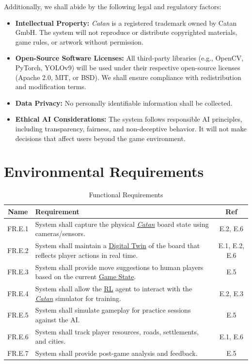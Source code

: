 \documentclass{article}
\newcommand{\Catan}{\href{https://en.wikipedia.org/wiki/Catan}{Catan}}
\newcommand{\RL}{\href{https://www.ibm.com/think/topics/reinforcement-learning}{RL}}
\newcommand{\DigitalTwin}{\href{https://en.wikipedia.org/wiki/Digital_twin}{Digital Twin}}
\newcommand{\GameState}{\href{https://milvus.io/ai-quick-reference/what-is-a-state-in-rl}{Game State}}
\begin{document}
Additionally, we shall abide by the following legal and regulatory factors:
\begin{itemize}
    \item \textbf{Intellectual Property:}
    \emph{Catan} is a registered trademark owned by Catan GmbH. The system will not reproduce or distribute copyrighted materials, game rules, or artwork without permission.

    \item \textbf{Open-Source Software Licenses:}
    All third-party libraries (e.g., OpenCV, PyTorch, YOLOv9) will be used under their respective open-source licenses (Apache 2.0, MIT, or BSD). We shall ensure compliance with redistribution and modification terms.

    \item \textbf{Data Privacy:}
    No personally identifiable information shall be collected.

    \item \textbf{Ethical AI Considerations:}
    The system follows responsible AI principles, including transparency, fairness, and non-deceptive behavior. It will not make decisions that affect users beyond the game environment.
\end{itemize}

\section*{Environmental Requirements}
\begin{table}[h!]
    \centering
    \begin{tabular}{|c|p{10cm}|c|}
    \hline
    \textbf{Name} & \textbf{Requirement} & \textbf{Ref} \\
    \hline
    FR.E.1 & System shall capture the physical \emph{\Catan{}} board state using cameras/sensors. & E.2, E.6 \\
    \hline
    FR.E.2 & System shall maintain a \DigitalTwin{} of the board that reflects player actions in real time. & E.1, E.2, E.6 \\
    \hline
    FR.E.3 & System shall provide move suggestions to human players based on the current \GameState{}. & E.5 \\
    \hline
    FR.E.4 & System shall allow the \RL{} agent to interact with the \emph{\Catan{}} simulator for training. & E.2, E.3 \\
    \hline
    FR.E.5 & System shall simulate gameplay for practice sessions against the AI. & E.5 \\
    \hline
    FR.E.6 & System shall track player resources, roads, settlements, and cities. & E.1, E.6 \\
    \hline
    FR.E.7 & System shall provide post-game analysis and feedback. & E.5 \\
    \hline
    \end{tabular}
    \caption{Functional Requirements}
    \label{tab:fr}
    \end{table}
    
\end{document}

